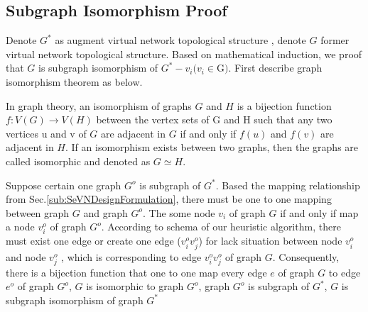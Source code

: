 \subsection{Subgraph Isomorphism Proof}
Denote $G^*$ as augment virtual network topological structure , denote $G$ former virtual network topological structure. Based on mathematical induction, we proof that $G$ is subgraph isomorphism of $G^*-v_i (v_i\in $G$)$. First describe graph isomorphism theorem as below.
\begin{theorem}
 In graph theory, an isomorphism of graphs $G$ and $H$ is a bijection function $f:V(G)\rightarrow V(H)$ between the vertex sets of G and H such that any two vertices u and v of $G$ are adjacent in $G$ if and only if $f(u)$ and $f(v)$ are adjacent in $H$. If an isomorphism exists between two graphs, then the graphs are called isomorphic and denoted as $G\simeq H$.
\end{theorem} 

Suppose certain one graph $G^o$ is subgraph of $G^*$. Based the mapping relationship from Sec.\ref{sub:SeVNDesignFormulation}, there must be one to one mapping between graph $G$ and graph $G^o$. The some node $v_i$ of graph $G$ if and only if map a node $v_i^o$ of graph $G^o$. According to schema of our heuristic algorithm, there must exist one edge or create one edge ($v^o_iv^o_j$) for lack situation between node $v^o_i$ and node $v^o_j$ , which is corresponding to edge $v^o_iv^o_j$ of graph $G$. Consequently, there is a bijection function that one to one map every edge $e$ of graph $G$ to edge $e^o$ of graph $G^o$, $G$ is isomorphic to graph $G^o$, graph $G^o$ is subgraph of $G^*$, $G$ is subgraph isomorphism of graph $G^*$

